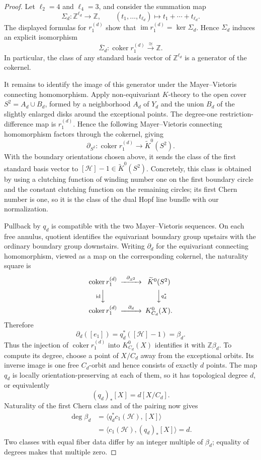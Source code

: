 \documentclass[11pt]{amsart}
\newcommand{\Z}{\mathbb Z}
\newcommand{\coker}{\operatorname{coker}}
\newcommand{\degc}{\operatorname{deg}}
\theoremstyle{remark}
\numberwithin{equation}{section}
\begin{document}
\begin{proof}
Let $\ell_2=4$ and $\ell_4=3$, and consider the summation map
\[
 \Sigma_d\colon\Z^{\ell_d}\longrightarrow\Z,
 \qquad (t_1,\ldots,t_{\ell_d})\longmapsto
 t_1+\cdots+t_{\ell_d}.
\]
The displayed formulas for $r_1^{(d)}$ show that $\operatorname{im}r_1^{(d)}=\ker\Sigma_d$. Hence $\Sigma_d$ induces an explicit isomorphism
\begin{equation*}
 \overline\Sigma_d\colon\coker r_1^{(d)}\xrightarrow{\cong}\Z.
\end{equation*}
In particular, the class of any standard basis vector of $\Z^{\ell_d}$ is a generator of the cokernel.

It remains to identify the image of this generator under the Mayer--Vietoris connecting homomorphism. Apply non-equivariant $K$-theory to the open cover $S^2=A_d\cup B_d$, formed by a neighborhood $A_d$ of $Y_d$ and the union $B_d$ of the slightly enlarged disks around the exceptional points. The degree-one
restriction-difference map is $r_1^{(d)}$. Hence the following Mayer--Vietoris connecting homomorphism factors through the cokernel, giving
\[
 \partial_{S^2}\colon\coker r_1^{(d)}\longrightarrow
 \widetilde K^0(S^2).
\]
With the boundary orientations chosen above, it sends the class of the first standard basis vector to $[\mathcal H]-1\in\widetilde K^0(S^2)$. Concretely, this class is obtained by using a clutching function of winding number one on the first boundary circle and the constant clutching function on the remaining circles; its first Chern number is one, so it is the class of the dual Hopf line bundle with our normalization.

Pullback by $q_d$ is compatible with the two Mayer--Vietoris sequences. On each free annulus, quotient identifies the equivariant boundary group upstairs with the ordinary boundary group downstairs. Writing $\partial_d$ for the equivariant connecting homomorphism, viewed as a map on the corresponding cokernel, the naturality square is
\[
\begin{CD}
 \coker r_1^{(d)} @>{\partial_{S^2}}>>
     \widetilde K^0(S^2)\\
 @V{\mathrm{id}}VV @VV{q_d^*}V\\
 \coker r_1^{(d)} @>{\partial_d}>> K_{C_d}^0(X).
\end{CD}
\]
Therefore
\[
 \partial_d([e_1])
 =q_d^*([\mathcal H]-1)=\beta_d.
\]
Thus the injection of $\coker r_1^{(d)}$ into $K_{C_d}^0(X)$ identifies
it with $\Z\beta_d$. To compute its degree, choose a point of $X/C_d$
away from the exceptional orbits. Its inverse image is one free
$C_d$-orbit and hence consists of exactly $d$ points. The map $q_d$ is
locally orientation-preserving at each of them, so it has topological
degree $d$, or equivalently
\[
 (q_d)_*[X]=d[X/C_d].
\]
Naturality of the first Chern class and of the pairing now
gives
\[
 \begin{aligned}
 \degc\beta_d
 &=\langle q_d^*c_1(\mathcal H),[X]\rangle\\
 &=\langle c_1(\mathcal H),(q_d)_*[X]\rangle=d.
 \end{aligned}
\]
Two classes with equal fiber data differ by an integer multiple of
$\beta_d$; equality of degrees makes that multiple zero.
\end{proof}
\end{document}
